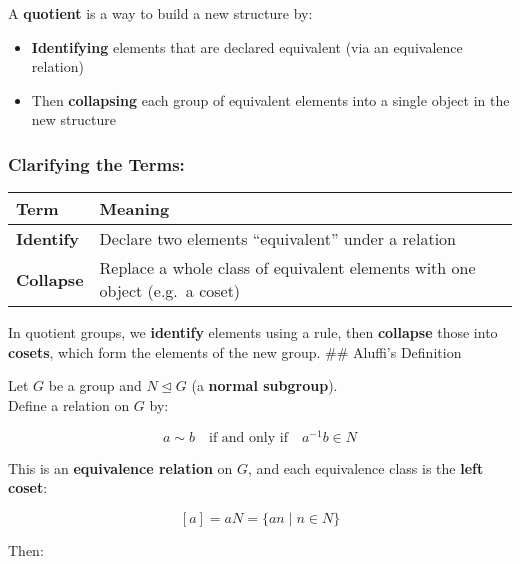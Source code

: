 \documentclass[]{article}
\providecommand{\tightlist}{%
  \setlength{\itemsep}{0pt}\setlength{\parskip}{0pt}}
\begin{document}
A \textbf{quotient} is a way to build a new structure by:

\begin{itemize}
\tightlist
\item
  \textbf{Identifying} elements that are declared equivalent (via an
  equivalence relation)
\item
  Then \textbf{collapsing} each group of equivalent elements into a
  single object in the new structure
\end{itemize}

\subsubsection{Clarifying the Terms:}\label{clarifying-the-terms}

\begin{longtable}[]{@{}
  >{\raggedright\arraybackslash}p{}
  >{\raggedright\arraybackslash}p{}@{}}
\toprule\noalign{}
\begin{minipage}[b]{\linewidth}\raggedright
Term
\end{minipage} & \begin{minipage}[b]{\linewidth}\raggedright
Meaning
\end{minipage} \\
\midrule\noalign{}
\endhead
\bottomrule\noalign{}
\endlastfoot
\textbf{Identify} & Declare two elements ``equivalent'' under a
relation \\
\textbf{Collapse} & Replace a whole class of equivalent elements with
one object (e.g.~a coset) \\
\end{longtable}

In quotient groups, we \textbf{identify} elements using a rule, then
\textbf{collapse} those into \textbf{cosets}, which form the elements of
the new group. \#\# Aluffi's Definition

Let \(G\) be a group and \(N \trianglelefteq G\) (a \textbf{normal
subgroup}).\\
Define a relation on \(G\) by:

\[
a \sim b \quad \text{if and only if} \quad a^{-1}b \in N
\]

This is an \textbf{equivalence relation} on \(G\), and each equivalence
class is the \textbf{left coset}:

\[
[a] = aN = \{ an \mid n \in N \}
\]

Then:
\end{document}
